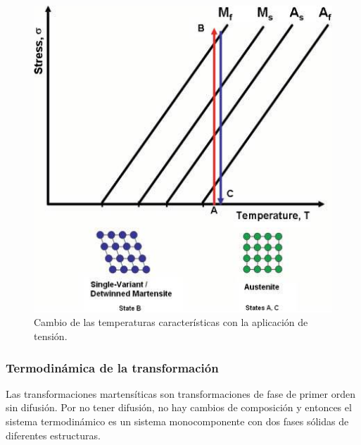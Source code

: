 \documentclass[12pt]{article}
\theoremstyle{definition}
\theoremstyle{remark}
\begin{document}
\begin{figure}[H]
	\centering
	\includegraphics[scale=0.4]{img/StressTransformation.png}
	\caption{Cambio de las temperaturas características con la aplicación de tensión.}
	\label{TvsS}
\end{figure}

\subsubsection{Termodinámica de la transformación}
Las transformaciones martensíticas son transformaciones de fase de primer orden sin difusión. Por no tener difusión, no hay cambios de composición y entonces el sistema termodinámico es un sistema monocomponente con dos fases sólidas de diferentes estructuras.\citep{Santamarta}
\end{document}
